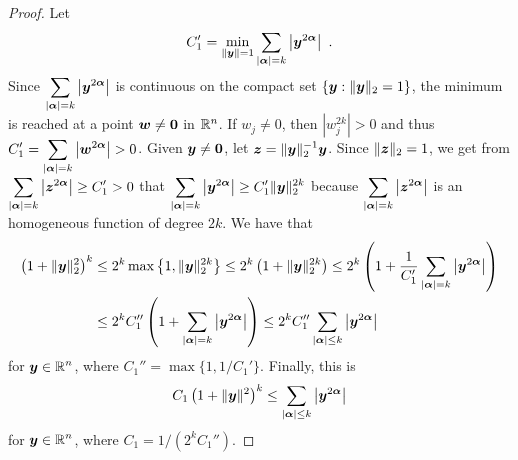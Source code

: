 \begin{proof}
 Let
\begin{equation} \label{sob_equi_Hk}
C_1' = \min_{\|{\bm{y}}\|=1} \sum_{|{\bm{\alpha}}|= k}
\left|{\bm{y}}^{2{\bm{\alpha}}}\right| \ .
\end{equation}
Since $\displaystyle \sum_{|{\bm{\alpha}}|= k}
\left|{\bm{y}}^{2{\bm{\alpha}}}\right|$ is 
continuous on the compact set $\{{\bm{y}} : \|{\bm{y}}\|_2=1\}$, the
minimum is reached at a point ${\bm{w}} \neq {\bm{0}}$ in $\mathbb{R}^n$.
If $w_j \neq 0$, then $\displaystyle \left| w_j^{2k}\right| >0$ and thus
$\displaystyle C_1' = \sum_{|{\bm{\alpha}}|= k}
\left|{\bm{w}}^{2{\bm{\alpha}}}\right| >0$.
Given ${\bm{y}} \neq {\bm{0}}$, let ${\bm{z}} = \|{\bm{y}}\|_2^{-1} {\bm{y}}$.
Since $\|{\bm{z}}\|_2 = 1$, we get from
$\displaystyle \sum_{|{\bm{\alpha}}|= k} \left|{\bm{z}}^{2{\bm{\alpha}}}\right| \geq
C_1' >0$ that
$\displaystyle \sum_{|{\bm{\alpha}}|= k} \left|{\bm{y}}^{2{\bm{\alpha}}}\right|
\geq C_1' \|{\bm{y}}\|_2^{2k}$
because $\displaystyle \sum_{|{\bm{\alpha}}|= k}
\left|{\bm{z}}^{2{\bm{\alpha}}}\right|$
is an homogeneous function of degree $2k$.  We have that
\begin{align*}
\left(1+\|{\bm{y}}\|_2^2\right)^k &\leq
2^k \max\left\{1, \|{\bm{y}}\|_2^{2k}\right\}
\leq 2^k \left( 1+ \|{\bm{y}}\|_2^{2k}\right)
\leq 2^k \left( 1 + \frac{1}{C_1' } \sum_{|{\bm{\alpha}}|= k}
\left|{\bm{y}}^{2{\bm{\alpha}}}\right| \right) \\
&\leq 2^k C_1'' \left( 1 + \sum_{|{\bm{\alpha}}|= k}
\left|{\bm{y}}^{2{\bm{\alpha}}}\right| \right)
\leq 2^k C_1'' \sum_{|{\bm{\alpha}}|\leq k} \left|{\bm{y}}^{2{\bm{\alpha}}}\right|
\end{align*}
for $\displaystyle {\bm{y}} \in \mathbb{R}^n$, where
$\displaystyle C_1'' = \max \{ 1 , 1/C_1'\}$.
Finally, this is
\[
C_1 \left(1+\|{\bm{y}}\|^2\right)^k
\leq \sum_{|{\bm{\alpha}}|\leq k} \left|{\bm{y}}^{2{\bm{\alpha}}}\right|
\]
for $\displaystyle {\bm{y}} \in \mathbb{R}^n$, where
$\displaystyle C_1 = 1/(2^k C_1'')$.


\end{proof}
